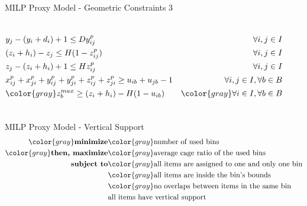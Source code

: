 \documentclass{beamer}
\begin{document}
\begin{frame}{MILP Proxy Model - Geometric Constraints 3}
\begin{columns}[onlytextwidth,T]
{\begin{minipage}{\linewidth}
\begin{align}
                                         & y_j - (y_i + d_i) + 1 \le D y^p_{ij}                                                     & \forall i,j \in I \notag \\
                                         & (z_i + h_i) - z_j\le H(1 - z^p_{ij})                                                     & \forall i,j \in I \notag \\
                                         & z_j - (z_i + h_i) + 1 \le H z^p_{ij}                                                     & \forall i,j \in I \notag \\
                                         & x^p_{ij} + x^p_{ji} + y^p_{ij} + y^p_{ji} + z^p_{ij} + z^p_{ji} \ge u_{ib} + u_{jb} - 1  & \forall i,j \in I, \forall b \in B \notag \\
                                         & \color{gray} z^{max}_b \ge (z_i + h_i) - H(1-u_{ib})                                                  & \color{gray} \forall i \in I, \forall b \in B \notag
                    \end{align}
                \end{minipage}
            }
            \end{columns}
    \end{frame}


    \begin{frame}{MILP Proxy Model - Vertical Support}
        \begin{eqnarray*}
            \color{gray} \textbf{minimize} & \color{gray} \text{number of used bins} \\
            \color{gray} \textbf{then, maximize} & \color{gray} \text{average cage ratio of the used bins} \\
            \textbf{subject to} & \color{gray} \text{all items are assigned to one and only one bin} \\
                                                & \color{gray} \text{all items are inside the bin's bounds} \\
                                                & \color{gray} \text{no overlaps between items in the same bin} \\
                                                & \text{all items have vertical support} \\
        \end{eqnarray*}
    \end{frame}
\end{document}
